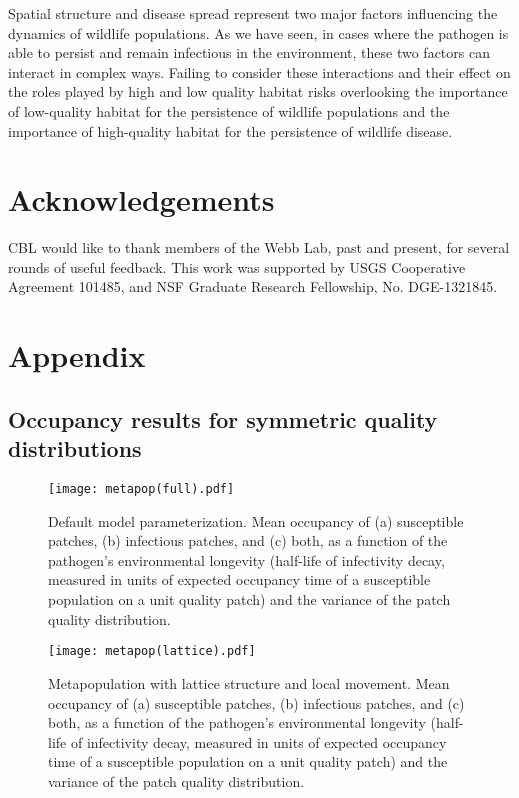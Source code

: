 \documentclass{svjour3}
\begin{document}
Spatial structure and disease spread represent two major factors influencing the dynamics of wildlife populations.  As we have seen, in cases where the pathogen is able to persist and remain infectious in the environment, these two factors can interact in complex ways.  Failing to consider these interactions and their effect on the roles played by high and low quality habitat risks overlooking the importance of low-quality habitat for the persistence of wildlife populations and the importance of high-quality habitat for the persistence of wildlife disease.

\section{Acknowledgements}

CBL would like to thank members of the Webb Lab, past and present, for several rounds of useful feedback.  This work was supported by USGS Cooperative Agreement 101485, and NSF Graduate Research Fellowship, No. DGE-1321845.


\clearpage

\section{Appendix}

\subsection{Occupancy results for symmetric quality distributions}

\begin{figure}[h!]
\centering
\texttt{[image: metapop(full).pdf]}
\caption{Default model parameterization.  Mean occupancy of (a) susceptible patches, (b) infectious patches, and (c) both, as a function of the pathogen's environmental longevity (half-life of infectivity decay, measured in units of expected occupancy time of a susceptible population on a unit quality patch) and the variance of the patch quality distribution.}
\label{poutcome}
\end{figure}   

\begin{figure}[h!]
\centering
\texttt{[image: metapop(lattice).pdf]}
\caption{Metapopulation with lattice structure and local movement.  Mean occupancy of (a) susceptible patches, (b) infectious patches, and (c) both, as a function of the pathogen's environmental longevity (half-life of infectivity decay, measured in units of expected occupancy time of a susceptible population on a unit quality patch) and the variance of the patch quality distribution.}
\label{poutcome_lattice}
\end{figure}   
\end{document}
